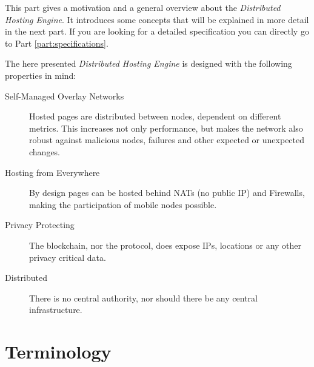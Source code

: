 
This part gives a motivation and a general overview about the
\textit{Distributed Hosting Engine}. It introduces some concepts that will be
explained in more detail in the next part. If you are looking for a detailed
specification you can directly go to Part \ref{part:specifications}.

The here presented \textit{Distributed Hosting Engine} is designed with the
following properties in mind:

\begin{description}
\item[Self-Managed Overlay Networks] Hosted pages are distributed between
nodes, dependent on different metrics. This increases not only performance,
but makes the network also robust against malicious nodes, failures and other
expected or unexpected changes.
\item[Hosting from Everywhere] By design pages can be hosted behind NATs (no
public IP) and Firewalls, making the participation of mobile nodes possible.
\item[Privacy Protecting] The blockchain, nor the protocol, does expose
IPs, locations or any other privacy critical data.
\item[Distributed] There is no central authority, nor should there be any
central infrastructure.
\end{description}

\section{Terminology}

